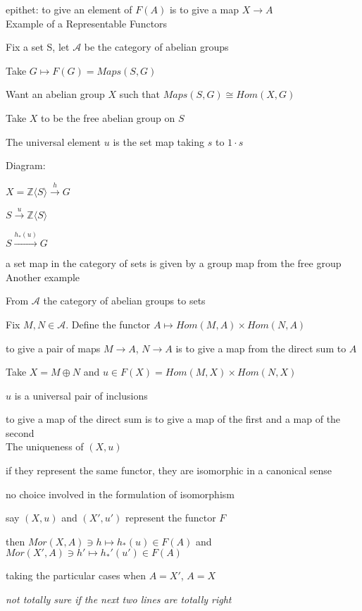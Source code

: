 \documentclass[12pt]{article}
\begin{document}
epithet: to give an element of $F(A)$ is to give a map $X \to A$\\

\noindent
Example of a Representable Functors

Fix a set S, let $\mathcal{A}$ be the category of abelian groups

Take $G \mapsto F(G) = Maps(S, G)$

Want an abelian group $X$ such that $Maps(S, G) \cong Hom(X, G)$

Take $X$ to be the free abelian group on $S$

The universal element $u$ is the set map taking $s$ to $1 \cdot s$

\noindent
Diagram:

$X = \mathds{Z}\langle S \rangle \xrightarrow{h} G$

$S \xrightarrow{u} \mathds{Z}\langle S \rangle$

$S \xrightarrow{h_*(u)} G$

\noindent
a set map in the category of sets is given by a group map from the free group\\

\noindent
Another example

From $\mathcal{A}$ the category of abelian groups to sets

Fix $M, N \in \mathcal{A}$.  Define the functor $A \mapsto Hom(M, A) \times Hom(N, A)$

to give a pair of maps $M \to A$, $N \to A$ is to give a map from the direct sum to $A$

Take $X = M \oplus N$ and $u \in F(X) = Hom(M, X) \times Hom(N, X)$

$u$ is a universal pair of inclusions

to give a map of the direct sum is to give a map of the first and a map of the second\\

\noindent
The uniqueness of $(X, u)$

if they represent the same functor, they are isomorphic in a canonical sense

no choice involved in the formulation of isomorphism

say $(X, u)$ and $(X', u')$ represent the functor $F$

then $Mor(X, A) \ni h \mapsto h_*(u) \in F(A)$ and $Mor(X', A) \ni h' \mapsto h_*'(u') \in F(A)$

taking the particular cases when $A = X'$, $A = X$

\textit{not totally sure if the next two lines are totally right}
\end{document}
